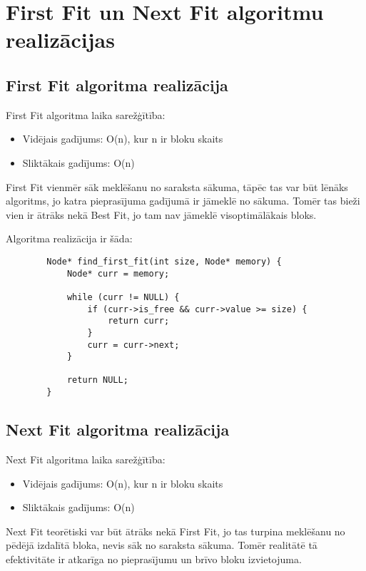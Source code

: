 \documentclass{report}
\begin{document}
	\section{First Fit un Next Fit algoritmu realizācijas}
	
	\subsection{First Fit algoritma realizācija}
	
	First Fit algoritma laika sarežģītība:
	\begin{itemize}
		\item Vidējais gadījums: O(n), kur n ir bloku skaits
		\item Sliktākais gadījums: O(n)
	\end{itemize}
	
	First Fit vienmēr sāk meklēšanu no saraksta sākuma, tāpēc tas var būt lēnāks algoritms, jo katra pieprasījuma gadījumā ir jāmeklē no sākuma. Tomēr tas bieži vien ir ātrāks nekā Best Fit, jo tam nav jāmeklē visoptimālākais bloks.
	
	Algoritma realizācija ir šāda:
	
	\begin{verbatim}
		Node* find_first_fit(int size, Node* memory) {
			Node* curr = memory;
			
			while (curr != NULL) {
				if (curr->is_free && curr->value >= size) {
					return curr;
				}
				curr = curr->next;
			}
			
			return NULL; 
		}
	\end{verbatim}
	
	\subsection{Next Fit algoritma realizācija}
	
	Next Fit algoritma laika sarežģītība:
	\begin{itemize}
		\item Vidējais gadījums: O(n), kur n ir bloku skaits
		\item Sliktākais gadījums: O(n)
	\end{itemize}
	
	Next Fit teorētiski var būt ātrāks nekā First Fit, jo tas turpina meklēšanu no pēdējā izdalītā bloka, nevis sāk no saraksta sākuma. Tomēr realitātē tā efektivitāte ir atkarīga no pieprasījumu un brīvo bloku izvietojuma.
	
\end{document}
